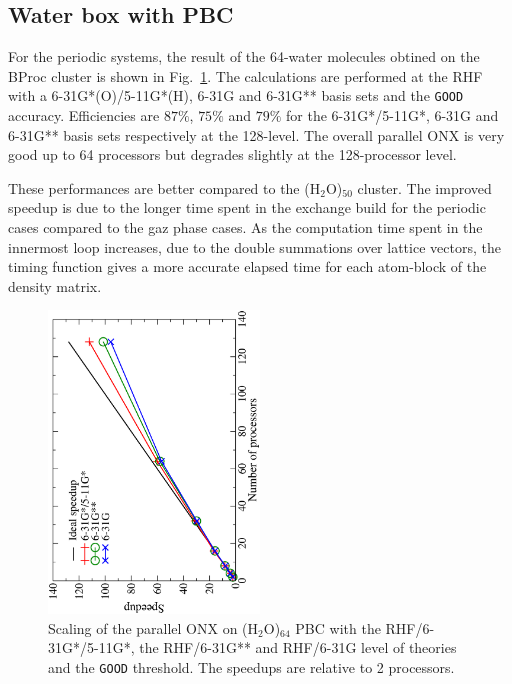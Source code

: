 \documentclass[prl,twocolumn,showpacs,twocolumngrid,superbib]{revtex4}
\begin{document}
\subsection{Water box with PBC}
 For the periodic systems, the result of the 64-water molecules obtined on the BProc cluster is shown
 in Fig.~\ref{fig:h2o_pbc_64}. The calculations are performed at the
 RHF with a 6-31G*(O)/5-11G*(H), 6-31G and 6-31G** basis sets and the {\tt GOOD} accuracy. 
 Efficiencies are $87\%$, $75\%$ and $79\%$ for the 6-31G*/5-11G*, 6-31G and 6-31G** 
 basis sets respectively at the 128-level. The overall parallel ONX is very
 good up to 64 processors but degrades slightly at the 128-processor level.

 These performances are better compared to the (H$_2$O)$_{50}$ cluster. The 
 improved speedup is due to the longer time spent in the
 exchange build for the periodic cases compared 
 to the gaz phase cases. As the computation time spent in the innermost loop 
 increases, due to the double summations over lattice vectors,
 the timing function gives a more accurate elapsed time for each 
 atom-block of the density matrix.\\

\begin{figure}[p]
  \caption{\protect
    Scaling of the parallel ONX on (H$_2$O)$_{64}$ PBC with the RHF/6-31G*/5-11G*,
    the RHF/6-31G** and RHF/6-31G level of theories and the {\tt GOOD} threshold. 
    The speedups are relative to 2 processors.
  }\label{fig:h2o_pbc_64}
  \includegraphics[angle=-90,width=0.5\textwidth]{h2o_pbc_64}
\end{figure}
\end{document}
